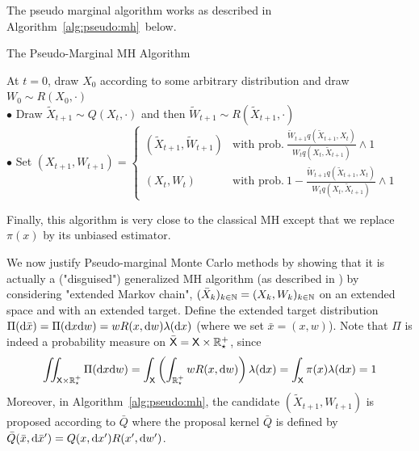 \documentclass[english,graybox,envcountchap,envcountsame,sectrefs,shortlabels]{svmono}
\theoremstyle{style}
\begin{document}
The pseudo marginal algorithm works as described in Algorithm~\ref{alg:pseudo:mh}\ below.
\begin{algorithm}
\caption{\label{alg:pseudo:mh} The Pseudo-Marginal MH Algorithm}

{}
\BlankLine
At $t=0$, draw $X_{0}$ according to some arbitrary distribution and draw $W_0\sim R(X_0,\cdot)$\\
{
$\bullet$ Draw $\tilde X_{t+1}\sim Q(X_{t},\cdot)$ and then $ \tilde W_{t+1}\sim R(\tilde X_{t+1},\cdot)$\\
$\bullet$ Set $(X_{t+1},W_{t+1})=\begin{cases} (\tilde X_{t+1},\tilde W_{t+1}) & \mbox{with prob.}\ \frac{\tilde W_{t+1} q(\tilde X_{t+1},X_t)}{W_t q(X_t,\tilde X_{t+1})}\wedge 1\\ (X_{t},W_t)& \mbox{with prob.}\ 1-\frac{\tilde W_{t+1} q(\tilde X_{t+1},X_t)}{W_t q(X_t,\tilde X_{t+1})}\wedge 1\end{cases}$
}
\end{algorithm}
Finally, this algorithm is very close to the classical MH except that we replace $\pi(x)$ by its unbiased estimator.



We now justify Pseudo-marginal Monte Carlo methods by showing that it is actually a ("disguised") generalized MH algorithm (as described in ) by considering "extended Markov chain", $(\bar X_k)_{k\in\mathbb{N}}=(X_k,W_k)_{k\in\mathbb{N}}$ on an extended space and with an extended target. Define the extended target distribution $\Pi(\mathrm{d} \bar x)=\Pi(\mathrm{d} x\mathrm{d} w)=w R(x,\mathrm{d} w) \lambda(\mathrm{d} x)$ (where we set $\bar x=(x,w)$). Note that $\Pi$ is indeed a probability measure on $\bar{\mathsf{X}}=\mathsf{X} \times \mathbb{R}^+_\star$, since
$$
\iint_{\mathsf{X}\times\mathbb{R}^+_\star} \Pi(\mathrm{d} x\mathrm{d} w)=\int_{\mathsf{X}} \left( \int_{\mathbb{R}^+_\star} w R(x,\mathrm{d} w)\right)\lambda(\mathrm{d} x)=\int_{\mathsf{X}} \pi(x)\lambda(\mathrm{d} x)=1
$$
Moreover, in Algorithm~\ref{alg:pseudo:mh}, the candidate $(\tilde X_{t+1},W_{t+1})$ is proposed according to $\bar Q$ where the proposal kernel $\bar Q$ is defined by $\bar Q( \bar x,\mathrm{d} \bar x')=Q(x,\mathrm{d} x') R(x',\mathrm{d} w')$.
\end{document}

